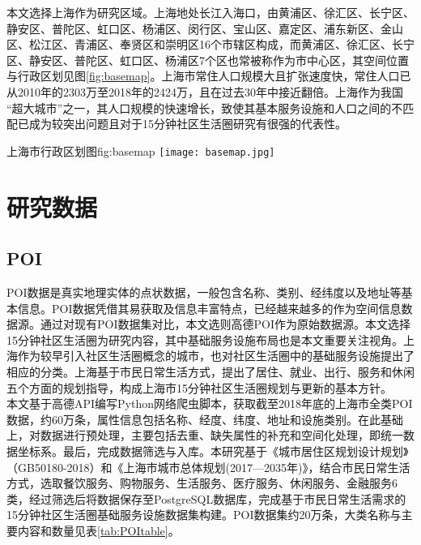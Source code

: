\documentclass{shnuthesis}
\begin{document}
本文选择上海作为研究区域。上海地处长江入海口，由黄浦区、徐汇区、长宁区、静安区、普陀区、虹口区、杨浦区、闵行区、宝山区、嘉定区、浦东新区、金山区、松江区、青浦区、奉贤区和崇明区16个市辖区构成，而黄浦区、徐汇区、长宁区、静安区、普陀区、虹口区、杨浦区7个区也常被称作为市中心区，其空间位置与行政区划见图\ref{fig:basemap}。上海市常住人口规模大且扩张速度快，常住人口已从2010年的2303万至2018年的2424万，且在过去30年中接近翻倍。上海作为我国 “超大城市”之一，其人口规模的快速增长，致使其基本服务设施和人口之间的不匹配已成为较突出问题且对于15分钟社区生活圈研究有很强的代表性。

\begin{generalfig}[htb]{上海市行政区划图}{fig:basemap}
	\texttt{[image: basemap.jpg]}
\end{generalfig}

\section{研究数据}

\subsection{POI}

POI数据是真实地理实体的点状数据，一般包含名称、类别、经纬度以及地址等基本信息。POI数据凭借其易获取及信息丰富特点，已经越来越多的作为空间信息数据源\textsuperscript{\cite{chenWS2016}}。通过对现有POI数据集对比\textsuperscript{\cite{zhang2017}}，本文选则高德POI作为原始数据源。本文选择15分钟社区生活圈为研究内容，其中基础服务设施布局也是本文重要关注视角。上海作为较早引入社区生活圈概念的城市，也对社区生活圈中的基础服务设施提出了相应的分类。上海基于市民日常生活方式，提出了居住、就业、出行、服务和休闲五个方面的规划指导，构成上海市15分钟社区生活圈规划与更新的基本方针。\\
\indent 本文基于高德API编写Python网络爬虫脚本，获取截至2018年底的上海市全类POI数据，约60万条，属性信息包括名称、经度、纬度、地址和设施类别。在此基础上，对数据进行预处理，主要包括去重、缺失属性的补充和空间化处理，即统一数据坐标系。最后，完成数据筛选与入库。本研究基于《城市居住区规划设计规划》（GB50180-2018）和《上海市城市总体规划(2017—2035年)》，结合市民日常生活方式，选取餐饮服务、购物服务、生活服务、医疗服务、休闲服务、金融服务6类，经过筛选后将数据保存至PostgreSQL数据库，完成基于市民日常生活需求的15分钟社区生活圈基础服务设施数据集构建。POI数据集约20万条，大类名称与主要内容和数量见表\ref{tab:POItable}。
\end{document}

